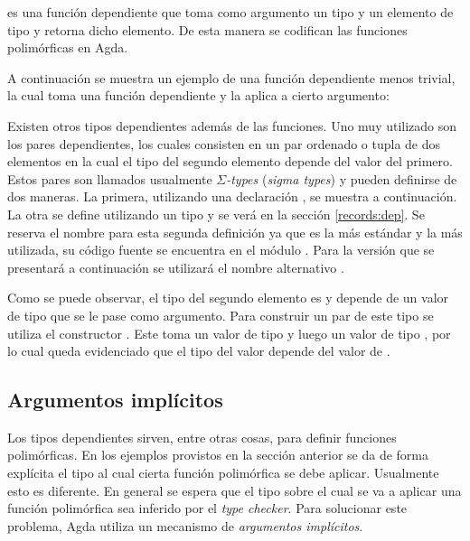 
 es una función dependiente que toma como argumento un tipo  y un elemento de tipo  y retorna dicho elemento. De esta manera se codifican las funciones polimórficas en Agda. 

A continuación se muestra un ejemplo de una función dependiente menos trivial, la cual toma una función dependiente y la aplica a cierto argumento:


Existen otros tipos dependientes además de las funciones. Uno muy utilizado son los pares dependientes, los cuales consisten en un par ordenado o tupla de dos elementos en la cual el tipo del segundo elemento depende del valor del primero. Estos pares son llamados usualmente \textit{$\Sigma$-types} (\textit{sigma types}) y pueden definirse de dos maneras. La primera, utilizando una declaración , se muestra a continuación. La otra se define utilizando un tipo  y se verá en la sección \ref{records:dep}. Se reserva el nombre \AgdaRecord{$\Sigma$} para esta segunda definición ya que es la más estándar y la más utilizada, su código fuente se encuentra en el módulo \href{https://agda.github.io/agda-stdlib/Agda.Builtin.Sigma.html}{}. Para la versión que se presentará a continuación se utilizará el nombre alternativo .


Como se puede observar, el tipo del segundo elemento es  y depende de un valor de tipo  que se le pase como argumento. Para construir un par de este tipo se utiliza el constructor \AgdaInductiveConstructor{$\_$,$\_$}. Este toma un valor  de tipo  y luego un valor  de tipo , por lo cual queda evidenciado que el tipo del valor  depende del valor de .

\subsection{Argumentos implícitos}\label{dependent:implicit}

Los tipos dependientes sirven, entre otras cosas, para definir funciones polimórficas. En los ejemplos provistos en la sección anterior se da de forma explícita el tipo al cual cierta función polimórfica se debe aplicar. Usualmente esto es diferente. En general se espera que el tipo sobre el cual se va a aplicar una función polimórfica sea inferido por el \textit{type checker}. Para solucionar este problema, Agda utiliza un mecanismo de \textit{argumentos implícitos}. 

